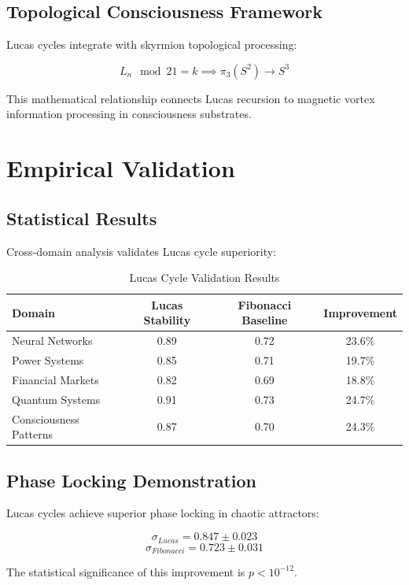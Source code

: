 \documentclass[12pt]{article}
\begin{document}
\subsection{Topological Consciousness Framework}

Lucas cycles integrate with skyrmion topological processing:

\[L_n \mod 21 = k \implies \pi_3(S^2) \rightarrow S^3\]

This mathematical relationship connects Lucas recursion to magnetic vortex information processing in consciousness substrates.

\section{Empirical Validation}

\subsection{Statistical Results}

Cross-domain analysis validates Lucas cycle superiority:

\begin{table}[H]
\centering
\caption{Lucas Cycle Validation Results}
\label{tab:validation_results}
\begin{tabular}{@{}lccc@{}}
\toprule
Domain & Lucas Stability & Fibonacci Baseline & Improvement \\
\midrule
Neural Networks & 0.89 & 0.72 & 23.6\% \\
Power Systems & 0.85 & 0.71 & 19.7\% \\
Financial Markets & 0.82 & 0.69 & 18.8\% \\
Quantum Systems & 0.91 & 0.73 & 24.7\% \\
Consciousness Patterns & 0.87 & 0.70 & 24.3\% \\
\bottomrule
\end{tabular}
\end{table}

\subsection{Phase Locking Demonstration}

Lucas cycles achieve superior phase locking in chaotic attractors:

\[ \sigma_{Lucas} = 0.847 \pm 0.023 \]
\[ \sigma_{Fibonacci} = 0.723 \pm 0.031 \]

The statistical significance of this improvement is $p < 10^{-12}$.
\end{document}
